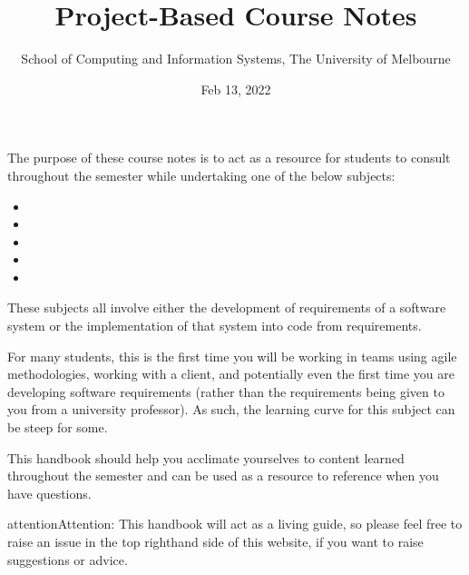 \documentclass[letterpaper,10pt,english]{jupyterBook}
\title{Project-Based Course Notes}
\date{Feb 13, 2022}
\author{School of Computing and Information Systems, The University of Melbourne}
\begin{document}
\pagestyle{empty}
\sphinxmaketitle
\pagestyle{plain}
\sphinxtableofcontents
\pagestyle{normal}
\label{\detokenize{chapter_0/introduction::doc}}


\sphinxAtStartPar
The purpose of these course notes is to act as a resource for students to consult throughout the semester while
undertaking one of the below subjects:
\begin{itemize}
\item {} 
\sphinxAtStartPar
{}

\item {} 
\sphinxAtStartPar
{}

\item {} 
\sphinxAtStartPar
{}

\item {} 
\sphinxAtStartPar
{}

\item {} 
\sphinxAtStartPar
{}

\end{itemize}

\sphinxAtStartPar
These subjects all involve either the development of requirements of a software system or the implementation of that
system into code from requirements.

\sphinxAtStartPar
For many students, this is the first time you will be working in teams using agile methodologies, working with a
client, and potentially even the first time you are developing software requirements (rather than the requirements
being given to you from a university professor). As such, the learning curve for this subject can be steep for some.

\sphinxAtStartPar
This handbook should help you acclimate yourselves to content learned throughout the semester and can be used as a
resource to reference when you have questions.

\begin{sphinxadmonition}{attention}{Attention:}
\sphinxAtStartPar
This handbook will act as a living guide, so please feel free to raise an issue in the top right\sphinxhyphen{}hand side of this
website, if you want to raise suggestions or advice.

\sphinxAtStartPar
{}
\end{sphinxadmonition}
\end{document}

